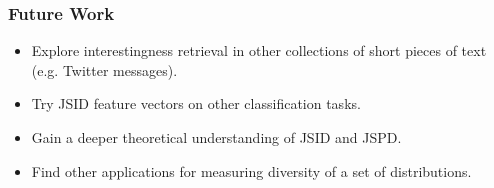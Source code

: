 \documentclass{beamer}
\begin{document}
\begin{frame}
\frametitle{Future Work}
\begin{itemize}
\item Explore interestingness retrieval in other collections of short pieces of
  text (e.g. Twitter messages).
\item Try JSID feature vectors on other classification tasks.
\item Gain a deeper theoretical understanding of JSID and JSPD.
\item Find other applications for measuring diversity of a set of
  distributions.
\end{itemize}
\end{frame}

\begin{frame}


\end{frame}
\end{document}
